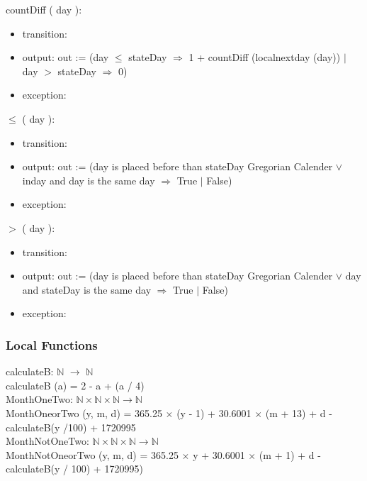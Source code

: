 \documentclass[12pt, titlepage]{article}
\begin{document}
\noindent  countDiff ( day ):
\begin{itemize}
\item transition: 
\item output: out := (day $\leq$ stateDay $\Rightarrow$ 1 + countDiff (localnextday (day)) $|$ day $>$  stateDay $\Rightarrow$ 0)
\item exception:
\end{itemize}


\noindent  $\leq$ ( day ):
\begin{itemize}
\item transition: 
\item output: out := (day is placed before than stateDay Gregorian Calender $\lor	$ inday and day is the same day $\Rightarrow$ True $|$ False)
\item exception:
\end{itemize}

\noindent $>$  ( day ):
\begin{itemize}
\item transition: 
\item output: out := (day is placed before than stateDay Gregorian Calender $\lor	$ day and stateDay is the same day $\Rightarrow$ True $|$ False)
\item exception:
\end{itemize}

\subsubsection{Local Functions}

calculateB: $\mathbb{N}$ $\rightarrow $ $\mathbb{N}$\\
calculateB (a) = 2 - a + (a / 4)\\

MonthOneTwo: $\mathbb{N} \times \mathbb{N} \times \mathbb{N} \rightarrow \mathbb{N}$\\
MonthOneorTwo (y, m, d) = 365.25 $\times$ (y - 1) + 30.6001 $\times$ (m + 13) + d - calculateB(y /100) +  1720995\\


MonthNotOneTwo: $\mathbb{N} \times \mathbb{N} \times \mathbb{N} \rightarrow \mathbb{N}$\\
MonthNotOneorTwo (y, m, d) = 365.25 $\times$ y + 30.6001 $\times$ (m + 1) + d - calculateB(y / 100) +  1720995)
\end{document}
